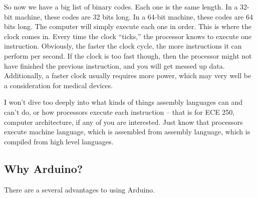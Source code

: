 \documentclass[10pt]{report}
\begin{document}
So now we have a big list of binary codes. Each one is the same length. In a 32-bit machine, these codes are 32 bits long. In a 64-bit machine, these codes are 64 bits long. The computer will simply execute each one in order. This is where the clock comes in. Every time the clock “ticks,” the processor knows to execute one instruction. Obviously, the faster the clock cycle, the more instructions it can perform per second. If the clock is too fast though, then the processor might not have finished the previous instruction, and you will get messed up data. Additionally, a faster clock usually requires more power, which may very well be a consideration for medical devices.
\par
I won’t dive too deeply into what kinds of things assembly languages can and can’t do, or how processors execute each instruction – that is for ECE 250, computer architecture, if any of you are interested. Just know that processors execute machine language, which is assembled from assembly language, which is compiled from high level languages.

\subsection*{Why Arduino?}
There are a several advantages to using Arduino.
\end{document}
